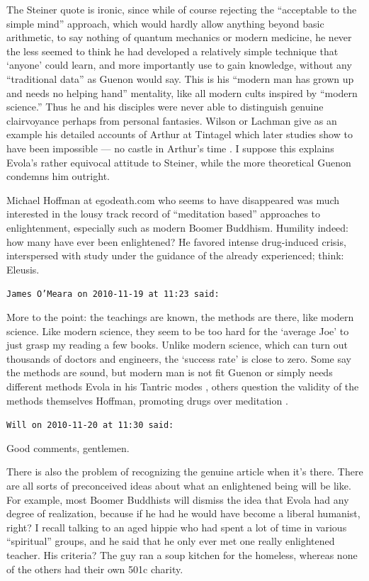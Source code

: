 \begin{footnotesize}
\begin{sffamily}
The Steiner quote is ironic, since while of course rejecting the ``acceptable to the simple mind'' approach, which would hardly allow anything beyond basic arithmetic, to say nothing of quantum mechanics or modern medicine, he never the less seemed to think he had developed a relatively simple technique that `anyone' could learn, and more importantly use to gain knowledge, without any ``traditional data'' as Guenon would say. This is his ``modern man has grown up and needs no helping hand'' mentality, like all modern cults inspired by ``modern science.'' Thus he and his disciples were never able to distinguish genuine clairvoyance perhaps from personal fantasies. Wilson or Lachman give as an example his detailed accounts of Arthur at Tintagel which later studies show to have been impossible --- no castle in Arthur's time . I suppose this explains Evola's rather equivocal attitude to Steiner, while the more theoretical Guenon condemns him outright.

Michael Hoffman at egodeath.com who seems to have disappeared was much interested in the lousy track record of ``meditation based'' approaches to enlightenment, especially such as modern Boomer Buddhism. Humility indeed: how many have ever been enlightened? He favored intense drug-induced crisis, interspersed with study under the guidance of the already experienced; think: Eleusis.

\hfill

\texttt{James O'Meara on 2010-11-19 at 11:23 said:}

More to the point: the teachings are known, the methods are there, like modern science. Like modern science, they seem to be too hard for the `average Joe' to just grasp my reading a few books. Unlike modern science, which can turn out thousands of doctors and engineers, the `success rate' is close to zero. Some say the methods are sound, but modern man is not fit Guenon or simply needs different methods Evola in his Tantric modes , others question the validity of the methods themselves Hoffman, promoting drugs over meditation .

\hfill

\texttt{Will on 2010-11-20 at 11:30 said:}

Good comments, gentlemen.

There is also the problem of recognizing the genuine article when it's there. There are all sorts of preconceived ideas about what an enlightened being will be like. For example, most Boomer Buddhists will dismiss the idea that Evola had any degree of realization, because if he had he would have become a liberal humanist, right? I recall talking to an aged hippie who had spent a lot of time in various ``spiritual'' groups, and he said that he only ever met one really enlightened teacher. His criteria? The guy ran a soup kitchen for the homeless, whereas none of the others had their own 501c charity.


\end{sffamily}
\end{footnotesize}
